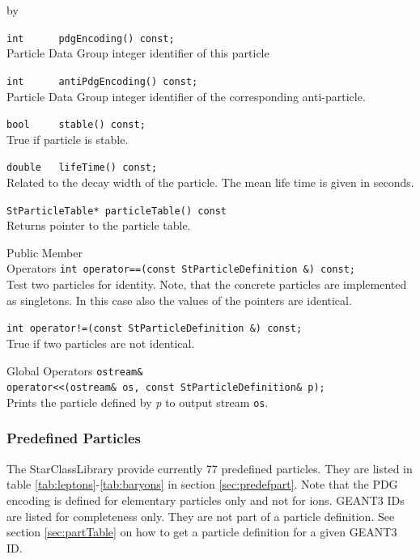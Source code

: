 \documentclass[twoside]{article}
\newcommand{\comp}[1]{\texttt{#1}}%
\newcommand{\args}[1]{\textit{#1}}%
\newcommand{\entrylabel}[1]{\mbox{\textbf{{#1}}}\hfil}%
\newenvironment{entry}
{\begin{list}{}%
    {\renewcommand{\makelabel}{\entrylabel}%
     \setlength{\labelwidth}{90pt}%
     \setlength{\leftmargin}{\labelwidth}
     \advance\leftmargin by \labelsep%
      }%
    }%
  {\end{list}}
\newcommand{\Entrylabel}[1]%
{\raisebox{0pt}[1ex][0pt]{\makebox[\labelwidth][l]%
    {\parbox[t]{\labelwidth}{\hspace{0pt}\textbf{{#1}}}}}}
\newenvironment{Entry}%
{\renewcommand{\entrylabel}{\Entrylabel}\begin{entry}}%
  {\end{entry}}
\begin{document}
\begin{Entry}
    \verb+int      pdgEncoding() const;+\\
    Particle Data Group integer identifier of this particle

    \verb+int      antiPdgEncoding() const;+\\
    Particle Data Group integer identifier of the corresponding
    anti-particle.
    
    \verb+bool     stable() const;+\\
    True if particle is stable.
    
    \verb+double   lifeTime() const;+\\ 
    Related to the decay width of the particle.
    The mean life time is given in seconds.
    
    \verb+StParticleTable* particleTable() const+\\ 
    Returns pointer to the particle table.
    
\item[Public Member\\ Operators]
    \verb+int operator==(const StParticleDefinition &) const;+\\
    Test two particles for identity.
    Note, that the concrete particles are implemented as singletons.
    In this case also the values of the pointers are identical.
    
    \verb+int operator!=(const StParticleDefinition &) const;+\\ 
    True if two particles are not identical.
    
\item[Global Operators]
    \verb+ostream& +\\
    \verb+operator<<(ostream& os, const StParticleDefinition& p);+\\ 
    Prints the particle defined by \args{p} to output
    stream \comp{os}.
\end{Entry}

\subsubsection{Predefined Particles}

The StarClassLibrary provide currently 77 predefined particles. They are listed in
table \ref{tab:leptons}-\ref{tab:baryons} in section \ref{sec:predefpart}.
Note that the PDG encoding is  defined for elementary particles only
and not for ions. GEANT3 IDs are listed for completeness only. They are not
part of a particle definition. See section \ref{sec:partTable} on how to
get a particle definition for a given GEANT3 ID.
\end{document}
